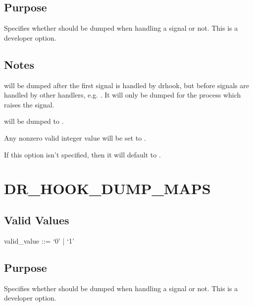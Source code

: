 \documentclass[letterpaper,10pt,english]{sphinxmanual}
\begin{document}
\subsection{Purpose}
\label{\detokenize{flag/flag:id186}}
\sphinxAtStartPar
Specifies whether  should be dumped when handling a signal or not. This is a developer option.


\subsection{Notes}
\label{\detokenize{flag/flag:id187}}
\sphinxAtStartPar
{} will be dumped after the first signal is handled by drhook, but before signals are handled by other handlers, e.g. . It will only be dumped for the process which raises the signal.

\sphinxAtStartPar
{} will be dumped to .

\sphinxAtStartPar
Any non\sphinxhyphen{}zero valid integer value will be set to .

\sphinxAtStartPar
If this option isn’t specified, then it will default to .


\section{DR\_HOOK\_DUMP\_MAPS}
\label{\detokenize{flag/flag:dr-hook-dump-maps}}\label{\detokenize{flag/flag:id190}}

\subsection{Valid Values}
\label{\detokenize{flag/flag:id191}}
\begin{DUlineblock}{0em}
\item[] valid\_value ::= ‘0’ | ‘1’
\end{DUlineblock}


\subsection{Purpose}
\label{\detokenize{flag/flag:id192}}
\sphinxAtStartPar
Specifies whether  should be dumped when handling a signal or not. This is a developer option.
\end{document}
